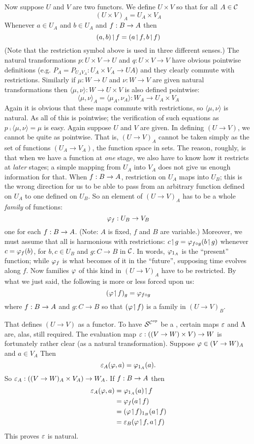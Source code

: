 Now suppose $U$ and $V$ are two functors. We define $U \times V$ so that for all $A \in \mathcal C$
$$
(U \times V)_A = U_A \times V_A
$$
%
Whenever $a \in U_A$ and $b \in U_A$ and $f: B \rightarrow A$ then
$$
(a,b) \!\upharpoonleft\! f = (a \!\upharpoonleft\! f, b \!\upharpoonleft\! f)
$$
(Note that the restriction symbol above is used in three different senses.) The natural transformations $p : U \times V \to U$ and $q: U\times V \to V$ have obvious pointwise definitions  (e.g. $P_A= P_{{U_A}{V_A}} : U_A \times V_A \to UA$) and they clearly commute with restrictions. Similarly if $\mu: W \to U$ and $\nu: W\to V$ are given natural transformations then $\langle \mu, \nu \rangle: W \to U \times V$ is also defined pointwise:
$$
{\langle \mu, \nu \rangle}_A = \langle \mu_A, \nu_A \rangle : W_A \to U_A \times V_A
$$
%
Again it is obvious that these maps commute with restrictions, so ${\langle \mu, \nu \rangle}$ is natural. As all of this is pointwise; the verification of such equations as $p \comp \langle \mu, \nu \rangle = \mu$ is easy. Again suppose $U$ and $V$ are given. In defining $(U \to V)$, we cannot be quite as pointwise. That is, $(U \to V)_A$ cannot be taken simply as the set of functions $(U_A \to V_A)$, the function space in sets. The reason, roughly, is that when we have a function at {\it one} stage, we also have to know how it restricts at {\it later} stages; a simple mapping from $U_A$ into $V_A$ does not give us enough information for that. When $f : B \rightarrow A$, restriction on
$U_A$ maps into $U_B$; this is the wrong direction for us to be able to pass from an arbitrary function defined on $U_A$ to one defined on $U_B$. So an element of $(U \to V)_A$ has to be a whole {\it family} of functions:
$$
\varphi_f: U_B \rightarrow V_B
$$
%
one for each $f: B \rightarrow A$. (Note: $A$ is fixed, $f$ and $B$ are variable.) Moreover, we must assume that all is harmonious with
restrictions: $c \!\upharpoonleft\! g = \varphi_{f \circ g} (b \!\upharpoonleft\! g)$ whenever $c = \varphi_f(b)$, for $b,c \in U_B$ and $g : C\to B$ in $\mathcal C$. In words, $\varphi_{{\mathrm 1}_A}$ is the ``present'' function; while $\varphi_f$ is what becomes of it in the ``future'', supposing time evolves along $f$. Now families $\varphi$ of this kind in
$(U\to V)_A$ have to be restricted. By what we just said, the following is more or less forced upon us:
$$
(\varphi \!\upharpoonleft\! f)_g = \varphi_{f\circ g}
$$
%
where $f : B \rightarrow A$ and $g: C\to B$ so that $(\varphi \!\upharpoonleft\! f)$ is a family in $(U\to V)_B$.

That defines $(U\to V)$ as a functor. To have $\mathcal S^{\mathcal C^{op}}$ be a \ccc, certain maps $\varepsilon$ and $\Lambda$ are, alas, still required. The evaluation map $\varepsilon : ((V\rightarrow W) \times V) \rightarrow W$ is fortunately rather clear (as a natural transformation). Suppose $\varphi \in (V \rightarrow W)_A$ and $a \in V_A$ Then
$$
\varepsilon_A(\varphi, a) = \varphi_{{\mathrm 1}_A} (a).
$$
%
So $\varepsilon_A : ((V \rightarrow W)_A \times V_A) \rightarrow W_A$. If $f: B \rightarrow A$ then
\begin{align*}
\ev_A(\ffam, a) &= \ffam_{\id_A}(a) \res f\\
&= \ffam_f(a \res f)\\
&= (\ffam \res f)_{\id_B} (a \res f)\\
&= \ev_B(\ffam \res f, a \res f)
\end{align*}
%
This proves $\varepsilon$ is natural.

